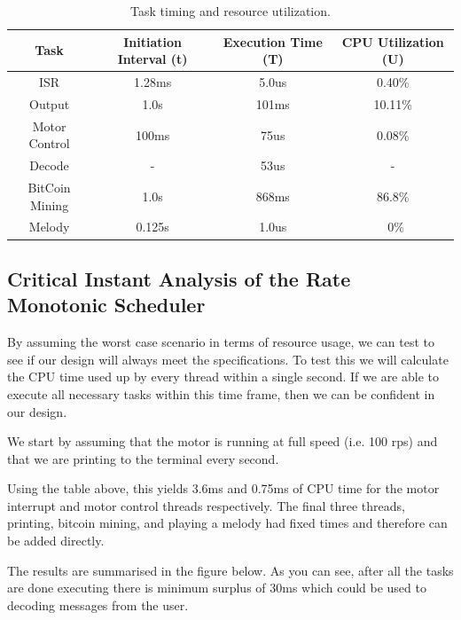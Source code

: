 \documentclass{article}
\begin{document}
\begin{table}[ht]
\centering                      %
\begin{tabular}{c c c c}        %
Task & Initiation Interval (t) & Execution Time (T) & CPU Utilization (U) \\ [0.5ex]   %
\hline                          %
ISR & 1.28ms & 5.0us & 0.40\% \\           %
Output & 1.0s & 101ms & 10.11\% \\                         
Motor Control & 100ms & 75us  & 0.08\% \\
Decode & - & 53us & - \\
BitCoin Mining & 1.0s & 868ms & 86.8\% \\
Melody & 0.125s & 1.0us & ~0\% \\[1ex]     %
\end{tabular}
\caption{Task timing and resource utilization.} 
\label{table:nonlin}            %
\end{table}


\subsection{Critical Instant Analysis of the Rate Monotonic Scheduler}

\noindent
By assuming the worst case scenario in terms of resource usage, we can test to see if our design will always meet the specifications.
To test this we will calculate the CPU time used up by every thread within a single second. If we are able to execute all necessary tasks within this time frame, then we can be confident in our design.

\bigskip

\noindent
We start by assuming that the motor is running at full speed (i.e. 100 rps) and that we are printing to the terminal every second.

\bigskip

\noindent
Using the table above, this yields 3.6ms and 0.75ms of CPU time for the motor interrupt and motor control threads respectively.
The final three threads, printing, bitcoin mining, and playing a melody had fixed times and therefore can be added directly.

\bigskip

\noindent
The results are summarised in the figure below. As you can see, after all the tasks are done executing there is minimum surplus of 30ms which could be used to decoding messages from the user.
\end{document}
